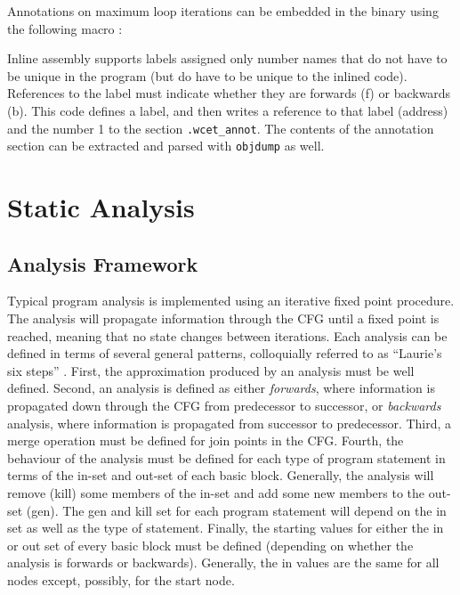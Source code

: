 Annotations on maximum loop iterations can be embedded in the binary using the following macro \cite{heptane}:


	Inline assembly supports labels assigned only number names that do not have to be unique in the program (but do have to be unique to the inlined code). 
	References to the label must indicate whether they are forwards (f) or backwards (b). 
	This code defines a label, and then writes a reference to that label (address) and the number 1 to the section \texttt{.wcet\_annot}. 
	The contents of the annotation section can be extracted and parsed with \texttt{objdump} as well.



% 


\section{Static Analysis}
\label{s:staticanalysis}
\subsection{Analysis Framework}

	Typical program analysis is implemented using an iterative fixed point procedure. 
	The analysis will propagate information through the CFG until a fixed point is reached, meaning that no state changes between iterations. 
	Each analysis can be defined in terms of several general patterns, colloquially referred to as ``Laurie's six steps'' \cite{lauriesteps}. 
	First, the approximation produced by an analysis must be well defined. 
	Second, an analysis is defined as either \emph{forwards}, where information is propagated down through the CFG from predecessor to successor, or \emph{backwards} analysis, where information is propagated from successor to predecessor. 
	Third, a merge operation must be defined for join points in the CFG. 
	Fourth, the behaviour of the analysis must be defined for each type of program statement in terms of the in-set and out-set of each basic block. Generally, the analysis will remove (kill) some members of the in-set and add some new members to the out-set (gen). The gen and kill set for each program statement will depend on the in set as well as the type of statement. 
	Finally, the starting values for either the in or out set of every basic block must be defined (depending on whether the analysis is forwards or backwards). Generally, the in values are the same for all nodes except, possibly, for the start node.

